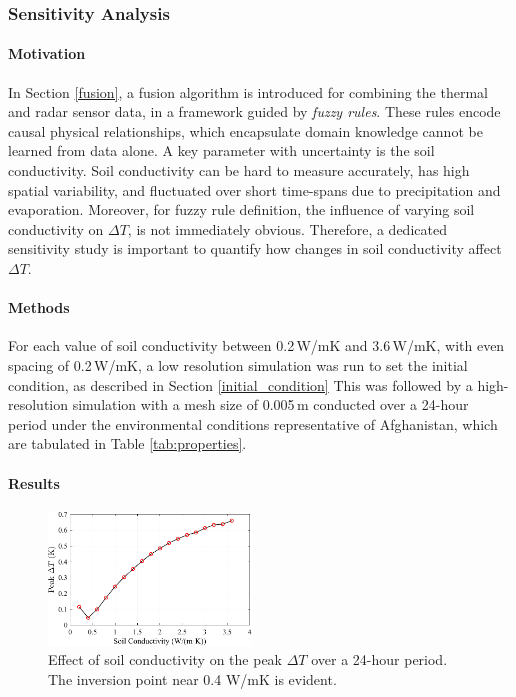     
    \subsubsection{Sensitivity Analysis}
    
        \paragraph{Motivation}
            
            In Section \ref{fusion}, a fusion algorithm is introduced for combining the thermal and radar sensor data, in a framework guided by \textit{fuzzy rules}. These rules encode causal physical relationships, which encapsulate domain knowledge cannot be learned from data alone. A key parameter with uncertainty is the soil conductivity. Soil conductivity can be hard to measure accurately, has high spatial variability, and fluctuated over short time-spans due to precipitation and evaporation. Moreover, for fuzzy rule definition, the influence of varying soil conductivity on \(\Delta T\), is not immediately obvious. Therefore, a dedicated sensitivity study is important to quantify how changes in soil conductivity affect \(\Delta T\).
        
        \paragraph{Methods}
        
            For each value of soil conductivity between 0.2\,W/mK and 3.6\,W/mK, with even spacing of 0.2\,W/mK, a low resolution simulation was run to set the initial condition, as described in Section \ref{initial_condition} This was followed by a high-resolution simulation with a mesh size of 0.005\,m conducted over a 24-hour period under the environmental conditions representative of Afghanistan, which are tabulated in Table \ref{tab:properties}.
        
        \paragraph{Results}
        
            \begin{figure}
                \centering
                \includegraphics[width=0.48\textwidth]{figs/Rory/thermal_sensitivity_conductivity.pdf}
                \caption[$\Delta T$ Sensitivity to thermal conductivity]{Effect of soil conductivity on the peak \(\Delta T\) over a 24-hour period. The inversion point near 0.4 W/mK is evident.}
                \label{conductivity}
            \end{figure}
        
